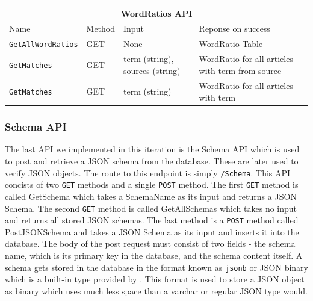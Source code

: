 \begin{table}[]
\begin{tabular}{|llll|}
\hline
\multicolumn{4}{|c|}{\textbf{WordRatios API}}                                                                                                                                           \\ \hline
\multicolumn{1}{|l|}{Name}                      & \multicolumn{1}{l|}{Method} & \multicolumn{1}{l|}{Input}                           & Reponse on success                               \\ \hline
\multicolumn{1}{|l|}{\texttt{GetAllWordRatios}} & \multicolumn{1}{l|}{GET}    & \multicolumn{1}{l|}{None}                            & WordRatio Table                                  \\ \hline
\multicolumn{1}{|l|}{\texttt{GetMatches}}       & \multicolumn{1}{l|}{GET}    & \multicolumn{1}{l|}{term (string), sources (string)} & WordRatio for all articles with term from source \\ \hline
\multicolumn{1}{|l|}{\texttt{GetMatches}}       & \multicolumn{1}{l|}{GET}    & \multicolumn{1}{l|}{term (string)}                   & WordRatio for all articles with term             \\ \hline
\end{tabular}
\end{table}

\subsubsection{Schema API}

The last API we implemented in this iteration is the Schema API which is used to post and retrieve a JSON schema from the database. These are later used to verify JSON objects.
The route to this endpoint is simply \texttt{/Schema}. 
This API concists of two \texttt{GET} methods and a single \texttt{POST} method. The first \texttt{GET} method is called GetSchema which takes a SchemaName as its input and returns a JSON Schema. The second \texttt{GET} method is called GetAllSchemas which takes no input and returns all stored JSON schemas. The last method is a \texttt{POST} method called PostJSONSchema and takes a JSON Schema as its input and inserts it into the database.  
The body of the post request must consist of two fields - the schema name, which is its primary key in the database, and the schema content itself. 
A schema gets stored in the database in the format known as \texttt{jsonb} or JSON binary which is a built-in type provided by \postgres{}.
This format is used to store a JSON object as binary which uses much less space than a varchar or regular JSON type would.


